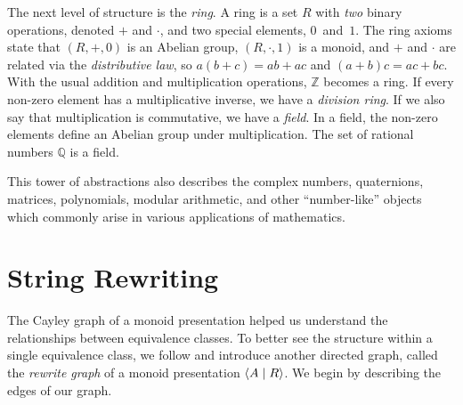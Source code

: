 \documentclass[../generics]{subfiles}
\begin{document}
The next level of structure is the \emph{ring}. A ring is a set $R$ with \emph{two} binary operations, denoted $+$ and $\cdot$, and two special elements, $0$~and~$1$. The ring axioms state that $(R,+,0)$ is an Abelian group, $(R,\cdot,1)$ is a monoid, and $+$ and $\cdot$ are related via the \emph{distributive law}, so $a(b+c)=ab+ac$ and $(a+b)c=ac+bc$. With the usual addition and multiplication operations, $\mathbb{Z}$ becomes a ring. If every non-zero element has a multiplicative inverse, we have a \emph{division ring}. If we also say that multiplication is commutative, we have a \emph{field}. In a field, the non-zero elements define an Abelian group under multiplication. The set of rational numbers $\mathbb{Q}$ is a field.

This tower of abstractions also describes the complex numbers, quaternions, matrices, polynomials, modular arithmetic, and other ``number-like'' objects which commonly arise in various applications of mathematics.

\section{String Rewriting}\label{sec:rewriting}

The Cayley graph of a monoid presentation helped us understand the relationships between equivalence classes. To better see the structure within a single equivalence class, we follow \cite{SQUIER1994271} and introduce another directed graph, called the \emph{rewrite graph} of a monoid presentation $\langle A \mid R\rangle$. We begin by describing the edges of our graph.
\end{document}
